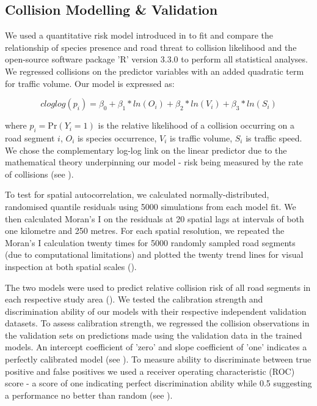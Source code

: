 \subsection{Collision Modelling \& Validation}

We used a quantitative risk model introduced in  to fit and compare the relationship of species presence and road threat to collision likelihood and the open-source software package ’R’ version 3.3.0 \citep{rdct16} to perform all statistical analyses. We regressed collisions on the predictor variables with an added quadratic term for traffic volume. Our model is expressed as:

\begin{equation}
cloglog(p_i) = \beta_0 + \beta_1*ln(O_i) + \beta_2*ln(V_i) + \beta_3*ln(S_i)
\end{equation}

\noindent where $p_i=\text{Pr}(Y_i=1)$ is the relative likelihood of a collision occurring on a road segment $i$, $O_i$ is species occurrence, $V_i$ is traffic volume, $S_i$ is traffic speed. We chose the complementary log-log link on the linear predictor due to the mathematical theory underpinning our model - risk being measured by the rate of collisions (see ).

To test for spatial autocorrelation, we calculated normally-distributed, randomised quantile residuals \citep{dunn96} using 5000 simulations from each model fit. We then calculated Moran's I on the residuals at 20 spatial lags at intervals of both one kilometre and 250 metres.  For each spatial resolution, we repeated the Moran's I calculation twenty times for 5000 randomly sampled road segments (due to computational limitations) and plotted the twenty trend lines for visual inspection at both spatial scales ().

The two models were used to predict relative collision risk of all road segments in each respective study area ().  We tested the calibration strength and discrimination ability of our models with their respective independent validation datasets. To assess calibration strength, we regressed the collision observations in the validation sets on predictions made using the validation data in the trained models. An intercept coefficient of 'zero' and slope coefficient of 'one' indicates a perfectly calibrated model (see \cite{mill91}). To measure ability to discriminate between true positive and false positives we used a receiver operating characteristic (ROC) score - a score of one indicating perfect discrimination ability while 0.5 suggesting a performance no better than random (see \cite{metz78}).

